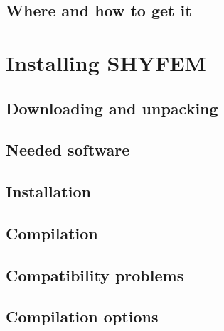 \documentclass{report}
\newcommand{\todo}[1]{This section still has to be written by #1}
\begin{document}
	\section{Where and how to get it}
	




\chapter{Installing SHYFEM}

	\section{Downloading and unpacking}
	

	\section{Needed software}
	

	\section{Installation}
	

	\section{Compilation}
	

	\section{Compatibility problems}
	

	\section{Compilation options}
	
\end{document}
